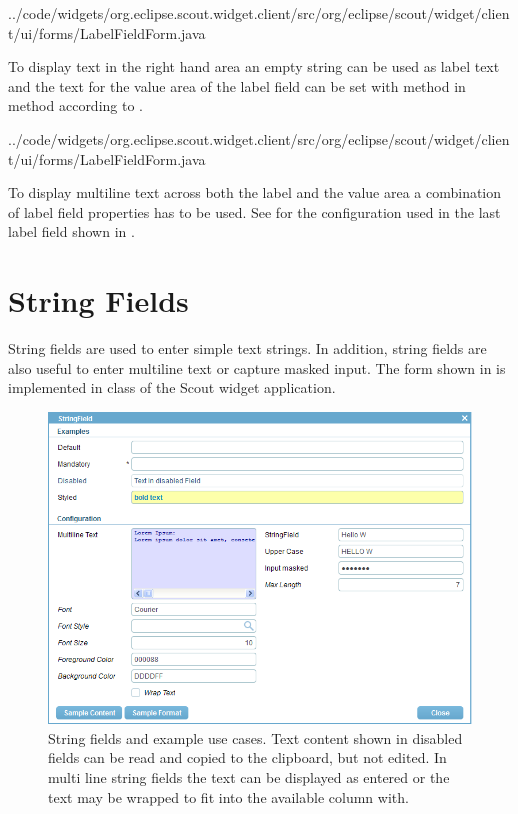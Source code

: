 \documentclass[a4paper,10pt,twoside]{book}
\begin{document}

{../code/widgets/org.eclipse.scout.widget.client/src/org/eclipse/scout/widget/client/ui/forms/LabelFieldForm.java}

To display text in the right hand area an empty string can be used as label text and the text for the value area of the label field can be set with method  in method  according to .


{../code/widgets/org.eclipse.scout.widget.client/src/org/eclipse/scout/widget/client/ui/forms/LabelFieldForm.java}

To display multiline text across both the label and the value area a combination of label field properties has to be used.
See  for the configuration used in the last label field shown in .

\section{String Fields}

String fields are used to enter simple text strings. 
In addition, string fields are also useful to enter multiline text or capture masked input.
The form shown in  is implemented in class  of the Scout widget application.

\begin{figure}
\includegraphics[width=15cm]{stringfield.png}
\caption{String fields and example use cases.
Text content shown in disabled fields can be read and copied to the clipboard, but not edited.
In multi line string fields the text can be displayed as entered or the text may be wrapped to fit into the available column with.}
\end{figure}
\end{document}
